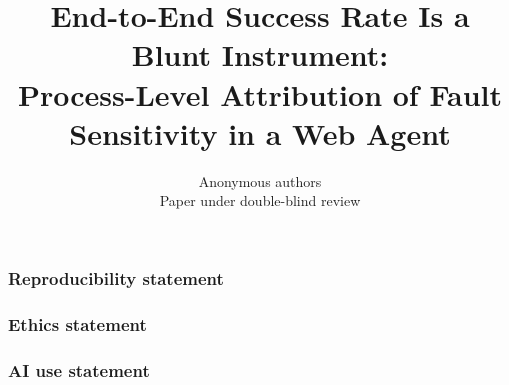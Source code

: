\documentclass{article}
\title{End-to-End Success Rate Is a Blunt Instrument:\\
Process-Level Attribution of Fault Sensitivity in a Web Agent}
\author{Anonymous authors\\
Paper under double-blind review}
\begin{document}
\maketitle

\begin{abstract}

\end{abstract}










\subsubsection*{Reproducibility statement}


\subsubsection*{Ethics statement}


\subsubsection*{AI use statement}





\appendix

\end{document}
